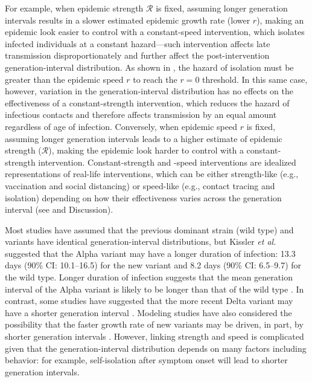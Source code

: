 \documentclass[12pt]{article}
\newcommand{\RR}{\ensuremath{{\mathcal R}}\xspace}
\begin{document}
For example, when epidemic strength $\RR$ is fixed, assuming longer generation intervals results in a slower estimated epidemic growth rate (lower $r$), making an epidemic look easier to control with a constant-speed intervention, which isolates infected individuals at a constant hazard---such intervention affects late transmission disproportionately and further affect the post-intervention generation-interval distribution.
As shown in \cite{doi:10.1098/rspb.2020.1556}, the hazard of isolation must be greater than the epidemic speed $r$ to reach the $r=0$ threshold.
In this same case, however, variation in the generation-interval distribution has no effects on the effectiveness of a constant-strength intervention, which reduces the hazard of infectious contacts and therefore affects transmission by an equal amount regardless of age of infection.
Conversely, when epidemic speed $r$ is fixed, assuming longer generation intervals leads to a higher estimate of epidemic strength ($\RR$), making the epidemic look harder to control with a constant-strength intervention.
Constant-strength and -speed interventions are idealized representations of real-life interventions, which can be either strength-like (e.g., vaccination and social distancing) or speed-like (e.g., contact tracing and isolation) depending on how their effectiveness varies across the generation interval (see \cite{doi:10.1098/rspb.2020.1556} and Discussion).

Most studies have assumed that the previous dominant strain (wild type) and variants have identical generation-interval distributions, but Kissler \textit{et al.} \citep{kissler2021densely} suggested that the Alpha variant may have a longer duration of infection: 13.3 days (90\% CI: 10.1--16.5) for the new variant and 8.2 days (90\% CI: 6.5--9.7) for the wild type.
Longer duration of infection suggests that the mean generation interval of the Alpha variant is likely to be longer than that of the wild type \citep{lloyd2001realistic,wearing2005appropriate,roberts2007model}.
In contrast, some studies have suggested that the more recent Delta variant may have a shorter generation interval \citep{li2021viral,zhang2021transmission}.
Modeling studies have also considered the possibility that the faster growth rate of new variants may be driven, in part, by shorter generation intervals \citep{davies2021estimated,volz2021transmission}.
However, linking strength and speed is complicated given that the generation-interval distribution depends on many factors including behavior: 
for example, self-isolation after symptom onset will lead to shorter generation intervals.
\end{document}
